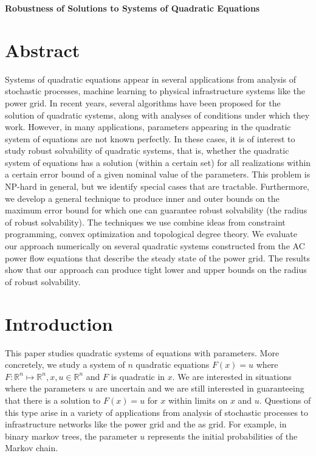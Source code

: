 \documentclass[11pt]{article}
\theoremstyle{plain}
\theoremstyle{definition}
\theoremstyle{remark}
\begin{document}
\begin{center}
\textbf{Robustness of Solutions to Systems of Quadratic Equations}
\end{center}



\section*{Abstract}
Systems of quadratic equations appear in several applications from analysis of stochastic processes, machine learning to physical infrastructure systems like the power grid. In recent years, several algorithms have been proposed for the solution of quadratic systems, along with analyses of conditions under which they work. However, in many applications, parameters appearing in the quadratic system of equations are not known perfectly. In these cases, it is of interest to study robust solvability of quadratic systems, that is, whether the quadratic system of equations has a solution (within a certain set) for all realizations within a certain error bound of a given nominal value of the parameters. This problem is NP-hard in general, but we identify special cases that are tractable. Furthermore, we develop a general technique to produce inner and outer bounds on the maximum error bound for which one can guarantee robust solvability (the radius of robust solvability).
The techniques we use combine ideas from constraint programming, convex optimization and topological degree theory. We evaluate our approach numerically on several quadratic systems constructed from the AC power flow equations that describe the steady state of the power grid. The results show that our approach can produce tight lower and upper bounds on the radius of robust solvability.


\section{Introduction}
This paper studies quadratic systems of equations with parameters. More concretely, we study a system of $n$ quadratic equations $F(x)=u$ where $F: \mathbb{R}^n \mapsto \mathbb{R}^n, x,u \in \mathbb{R}^n$ and $F$ is quadratic in $x$. We are interested in situations where the parameters $u$ are uncertain and we are still interested in guaranteeing that there is a solution to $F(x) = u$ for $x$ within limits on $x$ and $u$. Questions of this type arise in a variety of applications from analysis of stochastic processes to infrastructure networks like the power grid and the as grid. For example, in binary markov trees, the parameter $u$ represents the initial probabilities of the Markov chain.
\end{document}
